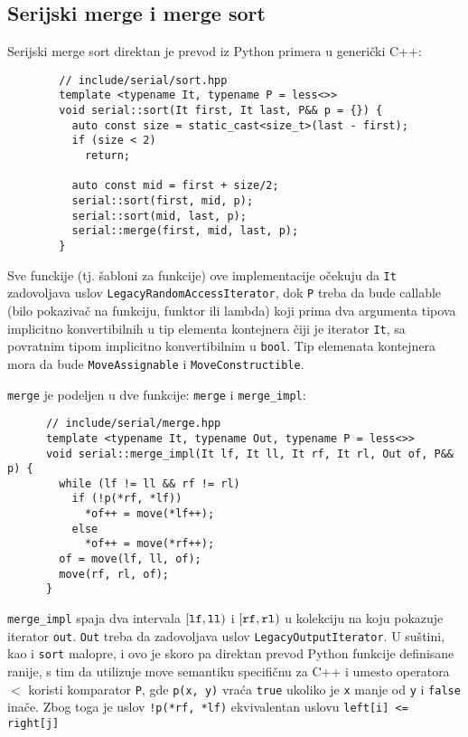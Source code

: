 \documentclass[a4paper,11pt]{article}
\begin{document}
    \subsection{Serijski merge i merge sort}
    Serijski merge sort direktan je prevod iz Python primera u generički C++:
    \begin{verbatim}
        // include/serial/sort.hpp
        template <typename It, typename P = less<>>
        void serial::sort(It first, It last, P&& p = {}) {
          auto const size = static_cast<size_t>(last - first);
          if (size < 2)
            return;

          auto const mid = first + size/2;
          serial::sort(first, mid, p);
          serial::sort(mid, last, p);
          serial::merge(first, mid, last, p);
        }
    \end{verbatim}
    Sve funckije (tj. šabloni za funkcije) ove implementacije očekuju da 
    \verb|It| zadovoljava uslov \verb|LegacyRandomAccessIterator|, dok \verb|P| treba da bude
    callable (bilo pokazivač na funkciju, funktor ili lambda) koji prima dva
    argumenta tipova implicitno konvertibilnih u tip elementa kontejnera čiji je iterator
    \verb|It|, sa povratnim tipom implicitno konvertibilnim u \verb|bool|. Tip elemenata 
    kontejnera mora da bude \verb|MoveAssignable| i \verb|MoveConstructible|.\par
    \verb|merge| je podeljen u dve funkcije: \verb|merge| i \verb|merge_impl|:
    \begin{verbatim}
      // include/serial/merge.hpp
      template <typename It, typename Out, typename P = less<>>
      void serial::merge_impl(It lf, It ll, It rf, It rl, Out of, P&& p) {
        while (lf != ll && rf != rl)
          if (!p(*rf, *lf))
            *of++ = move(*lf++);
          else
            *of++ = move(*rf++);
        of = move(lf, ll, of);
        move(rf, rl, of);
      }
    \end{verbatim}
    \verb|merge_impl| spaja dva intervala $[\verb|lf|, \verb|ll|)$ i $[\verb|rf|, \verb|rl|)$
    u kolekciju na koju pokazuje iterator \verb|out|. \verb|Out| treba da zadovoljava uslov
    \verb|LegacyOutputIterator|. U suštini, kao i \verb|sort| malopre, i ovo je skoro pa direktan prevod Python funkcije
    definisane ranije, s tim da utilizuje move semantiku specifičnu za C++ i umesto operatora $<$ koristi
    komparator \verb|P|, gde \verb|p(x, y)| vraća \verb|true| ukoliko je \verb|x| manje od \verb|y| i
    \verb|false| inače. Zbog toga je uslov \verb|!p(*rf, *lf)| ekvivalentan uslovu \verb|left[i] <= right[j]|
\end{document}
